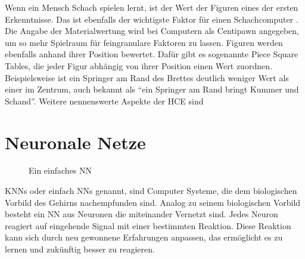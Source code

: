 Wenn ein Mensch Schach spielen lernt, ist der Wert der Figuren eines der ersten Erkenntnisse. Das ist ebenfalls der wichtigste Faktor für einen Schachcomputer \cite{Levy1988}. Die Angabe der Materialwertung wird bei Computern als Centipawn angegeben, um so mehr Spielraum für feingranulare Faktoren zu lassen. Figuren werden ebenfalls anhand ihrer Position bewertet. Dafür gibt es sogenannte Piece Square Tables, die jeder Figur abhängig von ihrer Position einen Wert zuordnen. Beispielsweise ist ein Springer am Rand des Brettes deutlich weniger Wert als einer im Zentrum, auch bekannt als \enquote{ein Springer am Rand bringt Kummer und Schand}. Weitere nennenswerte Aspekte der \ac{HCE} sind




\section{Neuronale Netze}

\begin{figure}
  \centering
  \caption{Ein einfaches \acl{NN}}
  \label{fig:beispiel-nn}
\end{figure}

\Acp{KNN} oder einfach \acp{NN} genannt, sind Computer Systeme, die dem biologischen Vorbild des Gehirns nachempfunden sind. Analog zu seinem biologischen Vorbild besteht ein \ac{NN} aus Neuronen die miteinander Vernetzt sind. Jedes Neuron reagiert auf eingehende Signal mit einer bestimmten Reaktion. Diese Reaktion kann sich durch neu gewonnene Erfahrungen anpassen, das ermöglicht es zu lernen und zukünftig besser zu reagieren.

